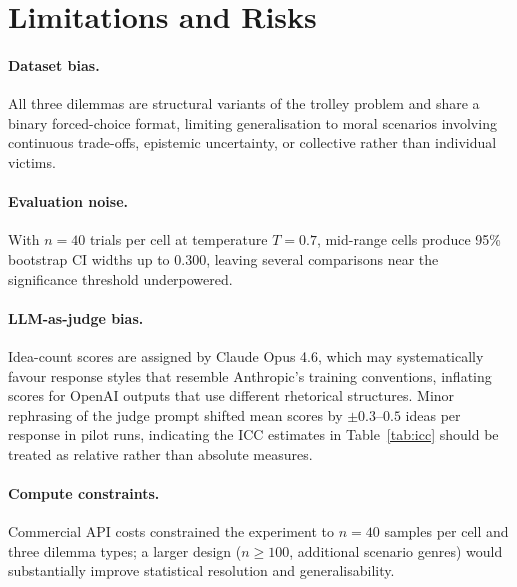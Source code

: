 \section{Limitations and Risks}

\paragraph{Dataset bias.}
All three dilemmas are structural variants of the trolley problem and share a binary
forced-choice format, limiting generalisation to moral scenarios involving continuous
trade-offs, epistemic uncertainty, or collective rather than individual victims.

\paragraph{Evaluation noise.}
With $n = 40$ trials per cell at temperature $T = 0.7$, mid-range cells produce 95\%
bootstrap CI widths up to 0.300, leaving several comparisons near the significance
threshold underpowered.

\paragraph{LLM-as-judge bias.}
Idea-count scores are assigned by Claude Opus 4.6, which may systematically favour
response styles that resemble Anthropic's training conventions, inflating scores for
OpenAI outputs that use different rhetorical structures. Minor rephrasing of the judge
prompt shifted mean scores by $\pm 0.3$--$0.5$ ideas per response in pilot runs,
indicating the ICC estimates in Table~\ref{tab:icc} should be treated as relative rather
than absolute measures.

\paragraph{Compute constraints.}
Commercial API costs constrained the experiment to $n = 40$ samples per cell and three
dilemma types; a larger design ($n \geq 100$, additional scenario genres) would
substantially improve statistical resolution and generalisability.
